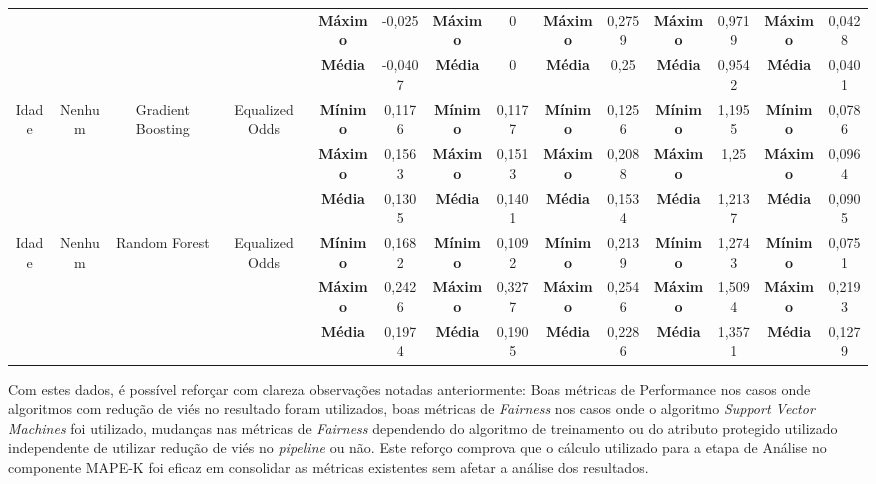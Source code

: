 \documentclass[portugues]{ic-tese}
\begin{document}
\begin{table}[H]
\begin{center}
{\begin{tabular}{c|c|c|c|c|c|c|c|c|c|c|c|c|c}
             & & & & \textbf{Máximo} & -0,025 & \textbf{Máximo} & 0 & \textbf{Máximo} & 0,2759 & \textbf{Máximo} & 0,9719 & \textbf{Máximo} & 0,0428 \\
             & & & & \textbf{Média} & -0,0407 & \textbf{Média} & 0 & \textbf{Média} & 0,25 & \textbf{Média} & 0,9542 & \textbf{Média} & 0,0401 \\
            \hline
            \multirow{3}{*}{Idade} & \multirow{3}{*}{Nenhum} & \multirow{3}{*}{Gradient Boosting} & \multirow{3}{*}{Equalized Odds} & \textbf{Mínimo} & 0,1176 & \textbf{Mínimo} & 0,1177 & \textbf{Mínimo} & 0,1256 & \textbf{Mínimo} & 1,1955 & \textbf{Mínimo} & 0,0786 \\
             & & & & \textbf{Máximo} & 0,1563 & \textbf{Máximo} & 0,1513 & \textbf{Máximo} & 0,2088 & \textbf{Máximo} & 1,25 & \textbf{Máximo} & 0,0964 \\
             & & & & \textbf{Média} & 0,1305 & \textbf{Média} & 0,1401 & \textbf{Média} & 0,1534 & \textbf{Média} & 1,2137 & \textbf{Média} & 0,0905 \\
            \hline
            \multirow{3}{*}{Idade} & \multirow{3}{*}{Nenhum} & \multirow{3}{*}{Random Forest} & \multirow{3}{*}{Equalized Odds} & \textbf{Mínimo} & 0,1682 & \textbf{Mínimo} & 0,1092 & \textbf{Mínimo} & 0,2139 & \textbf{Mínimo} & 1,2743 & \textbf{Mínimo} & 0,0751 \\
             & & & & \textbf{Máximo} & 0,2426 & \textbf{Máximo} & 0,3277 & \textbf{Máximo} & 0,2546 & \textbf{Máximo} & 1,5094 & \textbf{Máximo} & 0,2193 \\
             & & & & \textbf{Média} & 0,1974 & \textbf{Média} & 0,1905 & \textbf{Média} & 0,2286 & \textbf{Média} & 1,3571 & \textbf{Média} & 0,1279 \\
            \end{tabular}}
        \end{center}
    \end{table}

Com estes dados, é possível reforçar com clareza observações notadas anteriormente: Boas métricas de Performance nos casos onde algoritmos com redução de viés no resultado foram utilizados, boas métricas de \textit{Fairness} nos casos onde o algoritmo \textit{Support Vector Machines} foi utilizado, mudanças nas métricas de \textit{Fairness} dependendo do algoritmo de treinamento ou do atributo protegido utilizado independente de utilizar redução de viés no \textit{pipeline} ou não. Este reforço comprova que o cálculo utilizado para a etapa de Análise no componente MAPE-K foi eficaz em consolidar as métricas existentes sem afetar a análise dos resultados.
\end{document}
